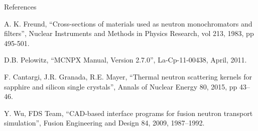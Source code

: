 \documentclass[final,t]{beamer}
\begin{document}
\begin{frame}{}
\begin{columns}[t]
\begin{column}{.3\linewidth}
\begin{block}{References}
\begin{thebibliography}{9}
A. K. Freund,
``Cross-sections of materials used as neutron monochromators and filters'',
Nuclear Instruments and Methods in Physics Research, vol 213, 1983, pp 495-501.

   D.B. Pelowitz,
   ``MCNPX Manual, Version 2.7.0'',
   La-Cp-11-00438, April, 2011.

  F. Cantargi, J.R. Granada, R.E. Mayer, 
  ``Thermal neutron scattering kernels for sapphire and silicon single crystals'', 
  Annals of Nuclear Energy 80, 2015, pp 43–46.  

  Y. Wu, FDS Team, 
  ``CAD-based interface programs for fusion neutron transport simulation'', 
  Fusion Engineering and Design 84, 2009, 1987–1992. \\

\end{thebibliography}
      \end{block}


    \end{column}
  \end{columns}



\end{frame}
\end{document}
